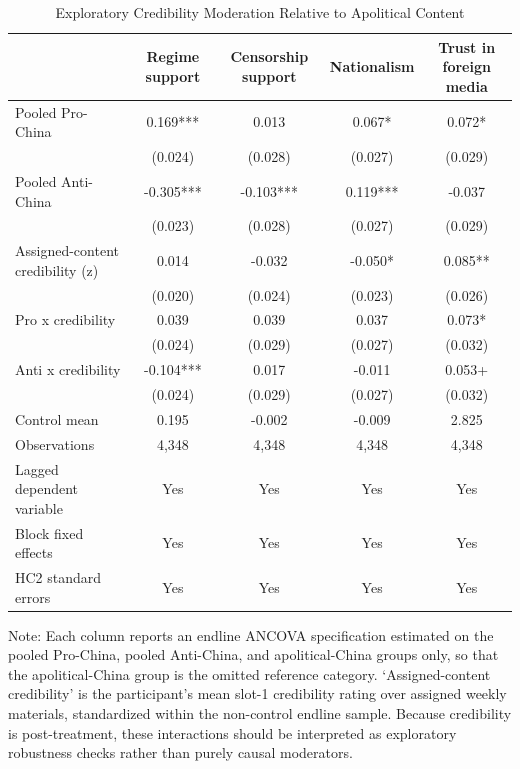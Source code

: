 \begin{table}[H]
\centering
\caption{Exploratory Credibility Moderation Relative to Apolitical Content}
\label{tab:credibility_moderation_t1}
\footnotesize
\begin{threeparttable}
\begin{tabular}{lcccc}
\toprule
 & Regime support & Censorship support & Nationalism & Trust in foreign media \\
\midrule
Pooled Pro-China & 0.169*** & 0.013 & 0.067* & 0.072* \\
 & (0.024) & (0.028) & (0.027) & (0.029) \\
\addlinespace
Pooled Anti-China & -0.305*** & -0.103*** & 0.119*** & -0.037 \\
 & (0.023) & (0.028) & (0.027) & (0.029) \\
\addlinespace
Assigned-content credibility (z) & 0.014 & -0.032 & -0.050* & 0.085** \\
 & (0.020) & (0.024) & (0.023) & (0.026) \\
\addlinespace
Pro x credibility & 0.039 & 0.039 & 0.037 & 0.073* \\
 & (0.024) & (0.029) & (0.027) & (0.032) \\
\addlinespace
Anti x credibility & -0.104*** & 0.017 & -0.011 & 0.053+ \\
 & (0.024) & (0.029) & (0.027) & (0.032) \\
\addlinespace
\midrule
Control mean & 0.195 & -0.002 & -0.009 & 2.825 \\
Observations & 4,348 & 4,348 & 4,348 & 4,348 \\
Lagged dependent variable & Yes & Yes & Yes & Yes \\
Block fixed effects & Yes & Yes & Yes & Yes \\
HC2 standard errors & Yes & Yes & Yes & Yes \\
\bottomrule
\end{tabular}
\begin{tablenotes}[flushleft]
\footnotesize
\item Note: Each column reports an endline ANCOVA specification estimated on the pooled Pro-China, pooled Anti-China, and apolitical-China groups only, so that the apolitical-China group is the omitted reference category. `Assigned-content credibility' is the participant's mean slot-1 credibility rating over assigned weekly materials, standardized within the non-control endline sample. Because credibility is post-treatment, these interactions should be interpreted as exploratory robustness checks rather than purely causal moderators.
\end{tablenotes}
\end{threeparttable}
\end{table}
